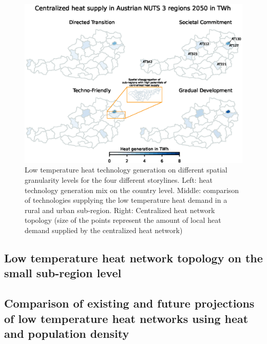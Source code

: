 \begin{figure}
	\centering
	\includegraphics[width=1\linewidth]{figures/4_Results/Heatmap.eps}
	\caption{Low temperature heat technology generation on different spatial granularity levels for the four different storylines. Left: heat technology generation mix on the country level. Middle: comparison of technologies supplying the low temperature heat demand in a rural and urban sub-region. Right: Centralized heat network topology (size of the points represent the amount of local heat demand supplied by the centralized heat network)}
	\label{fig:res2}
\end{figure}

\subsection{Low temperature heat network topology on the small sub-region level}\label{res:4}




\subsection{Comparison of existing and future projections of low temperature heat networks using heat and population density}\label{res:5}
















